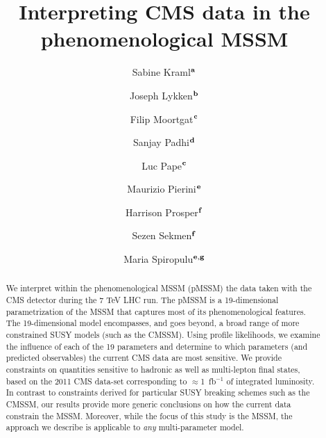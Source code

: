 \documentclass[12pt,aps,preprint,nofootinbib]{revtex4}
\begin{document}

\title{Interpreting CMS data in the phenomenological MSSM}

\author{Sabine Kraml$^{\bf a}$}

\author{Joseph Lykken$^{\bf b}$}

\author{Filip Moortgat$^{\bf c}$}

\author{Sanjay Padhi$^{\bf d}$}

\author{Luc Pape$^{\bf c}$}

\author{Maurizio Pierini$^{\bf e}$}

\author{Harrison Prosper$^{\bf f}$}

\author{Sezen Sekmen$^{\bf f}$}

\author{Maria Spiropulu$^{\bf e,g}$}

\begin{abstract}
We interpret within the phenomenological MSSM (pMSSM) the data taken with the CMS detector during the 7 TeV LHC run.  
The pMSSM is a 19-dimensional parametrization of the MSSM that captures most of 
its phenomenological features. The 19-dimensional model
encompasses, and goes beyond, a broad range of more constrained SUSY models (such as the CMSSM). 
Using profile likelihoods, we examine the influence of each of the 
19 parameters and determine to which parameters 
(and predicted observables) the current CMS data are most sensitive. 
We provide constraints on quantities sensitive to hadronic as well as multi-lepton final states, 
based on the 2011 CMS data-set corresponding to $\approx$1~fb$^{-1}$ of integrated luminosity.
In contrast to constraints derived for particular SUSY breaking schemes 
such as the CMSSM, our results provide more generic conclusions on how the current 
data constrain the MSSM. Moreover, while the focus of this study is the 
MSSM, the approach we describe is applicable to \emph{any} multi-parameter model.
\end{abstract}
\end{document}
